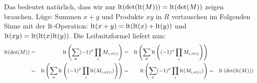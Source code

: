 Das bedeutet natürlich, dass wir nur ${\operatorname{lt}}(\det({\operatorname{lt}}(M))) = {\operatorname{lt}}(\det(M))$ zeigen brauchen.
Lüge: Summen $x+y$ und Produkte $xy$ in $R$ vertauschen im Folgenden Sinne mit der ${\operatorname{lt}}$-Operation: ${\operatorname{lt}}(x+y) = {\operatorname{lt}}({\operatorname{lt}}(x) + {\operatorname{lt}}(y))$ und ${\operatorname{lt}}(xy) = {\operatorname{lt}}({\operatorname{lt}}(x){\operatorname{lt}}(y))$.
Die Leibnitzformel liefert nun:
\begin{align*}
  {\operatorname{lt}}(\det(M))
&= &{\operatorname{lt}}\left(\sum_\sigma (-1)^\sigma \prod_i M_{i,\sigma(i)}\right)
&= &{\operatorname{lt}}\left(\sum_\sigma {\operatorname{lt}}\left((-1)^\sigma \prod_i M_{i,\sigma(i)}\right)\right)
& &
\\
&= &{\operatorname{lt}}\left(\sum_\sigma {\operatorname{lt}}\left((-1)^\sigma \prod_i {\operatorname{lt}}(M_{i,\sigma(i)})\right)\right)
&= &{\operatorname{lt}}\left(\sum_\sigma (-1)^\sigma \prod_i {\operatorname{lt}}(M_{i,\sigma(i)})\right)
&= &{\operatorname{lt}}\left(\det({\operatorname{lt}}(M))\right)
\end{align*}


